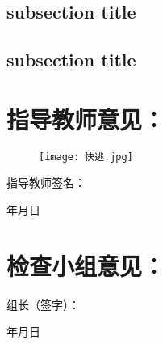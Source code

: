 \subsection{subsection title}
\lipsum[2-3]
\subsection{subsection title}
\lipsum[4-5]

\clearpage
\section*{指导教师意见：}

\begin{figure}[h]
    \centering
    \texttt{[image: 快逃.jpg]}
\end{figure}

\vspace{24bp}
\hfill 指导教师签名：\hspace{8\ccwd}

\vspace{24bp}
\hfill 年\hspace{2\ccwd}月\hspace{2\ccwd}日

\vspace{24bp}
\section*{检查小组意见：}

\vspace{80bp}
\hfill 组长（签字）：\hspace{8\ccwd}

\vspace{24bp}
\hfill 年\hspace{2\ccwd}月\hspace{2\ccwd}日
